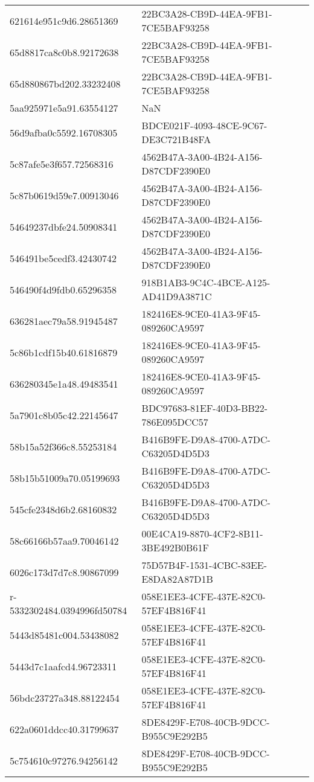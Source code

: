 \begin{tabular}{ll}
621614e951c9d6.28651369 & 22BC3A28-CB9D-44EA-9FB1-7CE5BAF93258 \\
65d8817ca8c0b8.92172638 & 22BC3A28-CB9D-44EA-9FB1-7CE5BAF93258 \\
65d880867bd202.33232408 & 22BC3A28-CB9D-44EA-9FB1-7CE5BAF93258 \\
5aa925971e5a91.63554127 & NaN \\
56d9afba0c5592.16708305 & BDCE021F-4093-48CE-9C67-DE3C721B48FA \\
5c87afe5e3f657.72568316 & 4562B47A-3A00-4B24-A156-D87CDF2390E0 \\
5c87b0619d59e7.00913046 & 4562B47A-3A00-4B24-A156-D87CDF2390E0 \\
54649237dbfe24.50908341 & 4562B47A-3A00-4B24-A156-D87CDF2390E0 \\
546491be5cedf3.42430742 & 4562B47A-3A00-4B24-A156-D87CDF2390E0 \\
546490f4d9fdb0.65296358 & 918B1AB3-9C4C-4BCE-A125-AD41D9A3871C \\
636281aec79a58.91945487 & 182416E8-9CE0-41A3-9F45-089260CA9597 \\
5c86b1cdf15b40.61816879 & 182416E8-9CE0-41A3-9F45-089260CA9597 \\
636280345e1a48.49483541 & 182416E8-9CE0-41A3-9F45-089260CA9597 \\
5a7901c8b05c42.22145647 & BDC97683-81EF-40D3-BB22-786E095DCC57 \\
58b15a52f366c8.55253184 & B416B9FE-D9A8-4700-A7DC-C63205D4D5D3 \\
58b15b51009a70.05199693 & B416B9FE-D9A8-4700-A7DC-C63205D4D5D3 \\
545cfe2348d6b2.68160832 & B416B9FE-D9A8-4700-A7DC-C63205D4D5D3 \\
58c66166b57aa9.70046142 & 00E4CA19-8870-4CF2-8B11-3BE492B0B61F \\
6026c173d7d7c8.90867099 & 75D57B4F-1531-4CBC-83EE-E8DA82A87D1B \\
r-5332302484.0394996fd50784 & 058E1EE3-4CFE-437E-82C0-57EF4B816F41 \\
5443d85481c004.53438082 & 058E1EE3-4CFE-437E-82C0-57EF4B816F41 \\
5443d7c1aafcd4.96723311 & 058E1EE3-4CFE-437E-82C0-57EF4B816F41 \\
56bdc23727a348.88122454 & 058E1EE3-4CFE-437E-82C0-57EF4B816F41 \\
622a0601ddcc40.31799637 & 8DE8429F-E708-40CB-9DCC-B955C9E292B5 \\
5c754610c97276.94256142 & 8DE8429F-E708-40CB-9DCC-B955C9E292B5 \\

\end{tabular}
